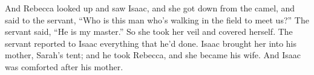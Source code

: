 \begin{inparaenum}
     And Rebecca looked up and saw Isaac, and she got down from the camel,%
     and said to the servant, ``Who is this man who's walking in the field to meet us?'' The servant said, ``He is my master.'' So she took her veil and covered herself.%
     The servant reported to Isaac everything that he'd done.%
     Isaac brought her into his mother, Sarah's tent; and he took Rebecca, and she became his wife. And Isaac was comforted after his mother.%
\end{inparaenum}
